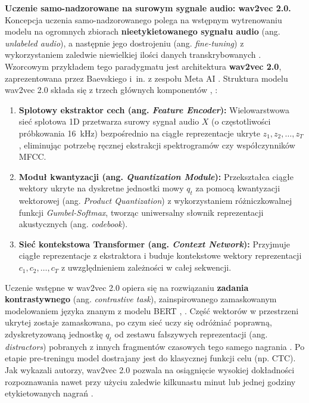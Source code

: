 \textbf{Uczenie samo-nadzorowane na surowym sygnale audio: wav2vec 2.0.} Koncepcja uczenia samo-nadzorowanego polega na wstępnym wytrenowaniu modelu na ogromnych zbiorach \textbf{nieetykietowanego sygnału audio} (ang. \textit{unlabeled audio}), a następnie jego dostrojeniu (ang. \textit{fine-tuning}) z wykorzystaniem zaledwie niewielkiej ilości danych transkrybowanych \cite[s.~1]{baevski2020wav2vec}. Wzorcowym przykładem tego paradygmatu jest architektura \textbf{wav2vec 2.0}, zaprezentowana przez Baevskiego i~in. z zespołu Meta AI \cite{baevski2020wav2vec}. Struktura modelu wav2vec 2.0 składa się z trzech głównych komponentów \cite[s.~2--3]{baevski2020wav2vec}, \cite[s.~370--371]{jurafsky2026}:
\begin{enumerate}
\item \textbf{Splotowy ekstraktor cech (ang. \textit{Feature Encoder}):} Wielowarstwowa sieć splotowa 1D przetwarza surowy sygnał audio $X$ (o częstotliwości próbkowania 16~kHz) bezpośrednio na ciągłe reprezentacje ukryte $z_1, z_2, \dots, z_T$, eliminując potrzebę ręcznej ekstrakcji spektrogramów czy współczynników MFCC.

\item \textbf{Moduł kwantyzacji (ang. \textit{Quantization Module}):} Przekształca ciągłe wektory ukryte na dyskretne jednostki mowy $q_t$ za pomocą kwantyzacji wektorowej (ang. \textit{Product Quantization}) z wykorzystaniem różniczkowalnej funkcji \textit{Gumbel-Softmax}, tworząc uniwersalny słownik reprezentacji akustycznych (ang. \textit{codebook}).

\item \textbf{Sieć kontekstowa Transformer (ang. \textit{Context Network}):} Przyjmuje ciągłe reprezentacje z ekstraktora i buduje kontekstowe wektory reprezentacji $c_1, c_2, \dots, c_T$ z uwzględnieniem zależności w całej sekwencji.
\end{enumerate}
Uczenie wstępne w wav2vec 2.0 opiera się na rozwiązaniu \textbf{zadania kontrastywnego} (ang. \textit{contrastive task}), zainspirowanego zamaskowanym modelowaniem języka znanym z modelu BERT \cite[s.~2--3]{baevski2020wav2vec}, \cite[s.~370--371]{jurafsky2026}. Część wektorów w przestrzeni ukrytej zostaje zamaskowana, po czym sieć uczy się odróżniać poprawną, zdyskretyzowaną jednostkę $q_t$ od zestawu fałszywych reprezentacji (ang. \textit{distractors}) pobranych z innych fragmentów czasowych tego samego nagrania \cite[s.~3]{baevski2020wav2vec}. Po etapie pre-treningu model dostrajany jest do klasycznej funkcji celu (np. CTC). Jak wykazali autorzy, wav2vec 2.0 pozwala na osiągnięcie wysokiej dokładności rozpoznawania nawet przy użyciu zaledwie kilkunastu minut lub jednej godziny etykietowanych nagrań \cite[s.~1, 5]{baevski2020wav2vec}.

